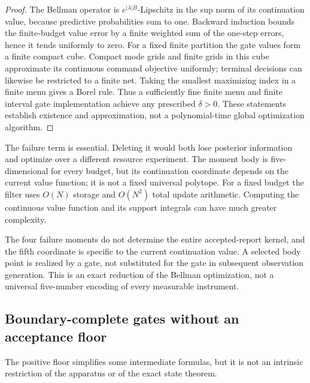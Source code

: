 \begin{proof}
The Bellman operator is $e^{|\lambda|B}$-Lipschitz in the sup norm of its
continuation value, because predictive probabilities sum to one. Backward
induction bounds the finite-budget value error by a finite weighted sum of
the one-step errors, hence it tends uniformly to zero. For a fixed finite
partition the gate values form a finite compact cube. Compact mode grids
and finite grids in this cube approximate its continuous command objective
uniformly; terminal decisions can likewise be restricted to a finite net.
Taking the smallest maximizing index in a finite menu gives a Borel rule.
Thus a sufficiently fine finite menu and finite interval gate implementation
achieve any prescribed $\delta>0$. These statements establish existence and
approximation, not a polynomial-time global optimization algorithm.
\end{proof}

The failure term is essential. Deleting it would both lose posterior
information and optimize over a different resource experiment. The moment
body is five-dimensional for every budget, but its continuation coordinate
depends on the current value function; it is not a fixed universal polytope.
For a fixed budget the filter uses $O(N)$ storage and $O(N^2)$ total update
arithmetic. Computing the continuous value function and its support
integrals can have much greater complexity.

The four failure moments do not determine the entire accepted-report
kernel, and the fifth coordinate is specific to the current continuation
value. A selected body point is realized by a gate, not substituted for the
gate in subsequent observation generation. This is an exact reduction of
the Bellman optimization, not a universal five-number encoding of every
measurable instrument.

\subsection{Boundary-complete gates without an acceptance floor}
The positive floor simplifies some intermediate formulas, but it is not an
intrinsic restriction of the apparatus or of the exact state theorem.

